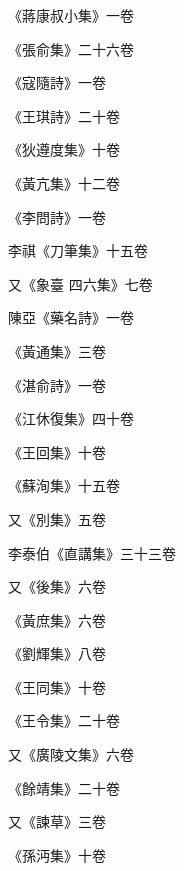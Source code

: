 \begin{pinyinscope}
 《蔣康叔小集》一卷



 《張俞集》二十六卷



 《寇隨詩》一卷



 《王琪詩》二十卷



 《狄遵度集》十卷



 《黃亢集》十二卷



 《李問詩》一卷



 李祺《刀筆集》十五卷



 又《象臺
 四六集》七卷



 陳亞《藥名詩》一卷



 《黃通集》三卷



 《湛俞詩》一卷



 《江休復集》四十卷



 《王回集》十卷



 《蘇洵集》十五卷



 又《別集》五卷



 李泰伯《直講集》三十三卷



 又《後集》六卷



 《黃庶集》六卷



 《劉輝集》八卷



 《王同集》十卷



 《王令集》二十卷



 又《廣陵文集》六卷



 《餘靖集》二十卷



 又《諫草》三卷



 《孫沔集》十卷




\end{pinyinscope}
